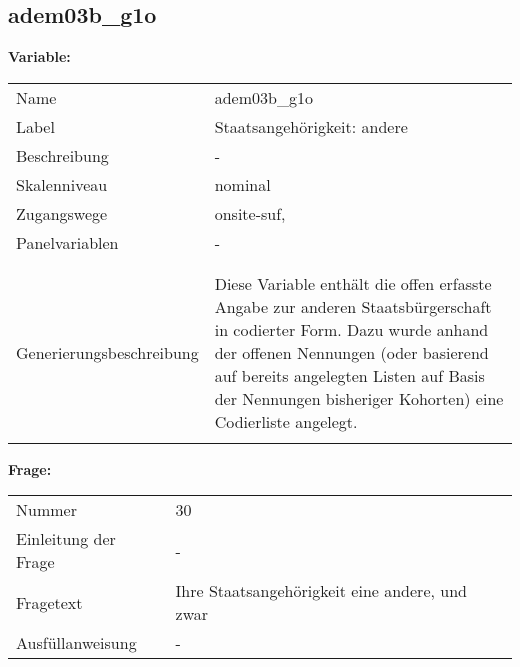 	
	
	\subsection{adem03b\_g1o}
	\label{subSection:adem03b_g1o}

	\noindent\textbf{Variable:}\\
		\begin{tabular}{lL{11.3cm}}
			\label{tableVariable:adem03b_g1o}
			Name & adem03b\_g1o \\
			Label & Staatsangehörigkeit: andere \\
			Beschreibung & - \\
			Skalenniveau & nominal \\
			Zugangswege &
				onsite-suf,
 \\
			Panelvariablen & -
			 \\
			 \\
 \\
					Generierungsbeschreibung & Diese Variable enthält die offen erfasste Angabe zur anderen Staatsbürgerschaft in codierter Form. Dazu wurde anhand der offenen Nennungen (oder basierend auf bereits angelegten Listen auf Basis der Nennungen bisheriger Kohorten) eine Codierliste angelegt.
				 \\	
			 \\
		\end{tabular}

		\vspace*{1 cm}
		\noindent\textbf{Frage:}\\
		\begin{tabular}{lL{11.3cm}}
			\label{tableQuestion:adem03b_g1o}
			Nummer & 30 \\
			Einleitung der Frage & - \\
			Fragetext & Ihre Staatsangehörigkeit
eine andere, und zwar \\
			Ausfüllanweisung & - \\
		\end{tabular}





